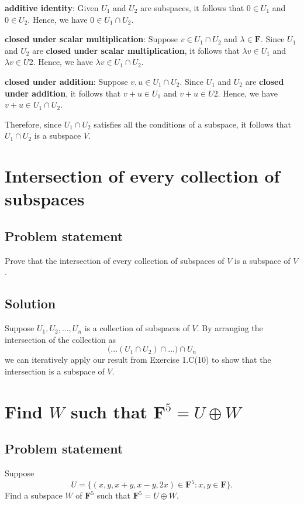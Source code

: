 \documentclass{article}
\begin{document}
\textbf{additive identity}: Given $U_1$ and $U_2$ are subspaces, it follows that $0\in U_1$ and $0\in U_2$. 
Hence, we have $0\in U_1\cap U_2$.

\textbf{closed under scalar multiplication}: Suppose $v\in U_1\cap U_2$ and $\lambda\in\mathbf{F}$. 
Since $U_1$ and $U_2$ are \textbf{closed under scalar multiplication}, it follows that $\lambda v\in U_1$ and $\lambda v\in U2$. 
Hence, we have $\lambda v\in U_1\cap U_2$.

\textbf{closed under addition}: Suppose $v,u\in U_1\cap U_2$. 
Since $U_1$ and $U_2$ are \textbf{closed under addition}, it follows that $v+u\in U_1$ and $v+u\in U2$. 
Hence, we have $v+u\in U_1\cap U_2$.

Therefore, since $U_1\cap U_2$ satisfies all the conditions of a subspace, it follows that $ U_1\cap U_2$ is a subspace $V$.

\clearpage

\renewcommand{\thesection}{11}
\section{Intersection of every collection of subspaces}
\subsection*{Problem statement}
Prove that the intersection of every collection of subspaces of $V$ is a subspace of $V$.

\subsection*{Solution}
Suppose $U_1,U_2,\ldots,U_n$ is a collection of subspaces of $V$. 
By arranging the intersection of the collection as 
\[\big(\ldots(U_1\cap U_2)\cap\ldots\big)\cap U_n\]
we can iteratively apply our result from Exercise 1.C(10) to show that the intersection is a subspace of $V$.

\clearpage

\renewcommand{\thesection}{21}
\section{Find $W$ such that $\mathbf{F}^5=U\oplus W$}
\subsection*{Problem statement}
Suppose 
\[U=\{ (x,y,x+y,x-y,2x)\in \mathbf{F}^5:x,y\in\mathbf{F}\}.\]
Find a subspace $W$ of $\mathbf{F}^5$ such that $\mathbf{F}^5=U\oplus W$.
\end{document}
